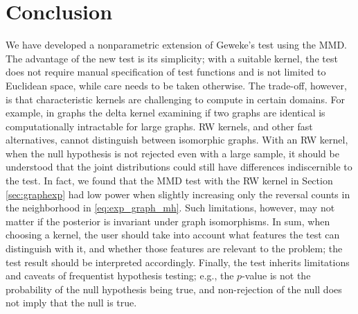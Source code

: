 \documentclass{article}
\begin{document}
\section{Conclusion}
\label{sec:conclusion}
We have developed a nonparametric extension of Geweke's test using the MMD.   
The advantage of the new test is its simplicity; with a suitable kernel, the test does not require manual specification of test functions and is not limited to Euclidean space, while care needs to be taken otherwise. The trade-off, however, is that characteristic kernels are challenging to compute in certain domains.
For example, in graphs the delta kernel examining if two graphs are identical is computationally intractable for large graphs. 
RW kernels, and other fast alternatives, cannot distinguish between isomorphic graphs. 
With an RW kernel, when the null hypothesis is not rejected even with a large sample, it should be understood that the joint distributions could still have differences indiscernible to the test. 
In fact, we found that the MMD test with the RW kernel in Section \ref{sec:graphexp} had low power when slightly increasing only the reversal counts in the neighborhood in \eqref{eq:exp_graph_mh}. 
Such limitations, however, may not matter if the posterior is invariant under graph isomorphisms. 
In sum, when choosing a kernel, the user should take into account what features the test can distinguish with it, and whether those features are relevant to the problem; the test result should be interpreted accordingly. 
Finally, the test inherits limitations and caveats of frequentist hypothesis testing; e.g., the $p$-value is not the probability of the null hypothesis being true, and non-rejection of the null does not imply that the null is true. 
\end{document}
